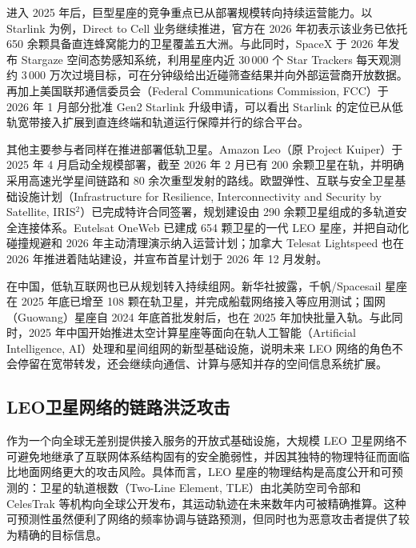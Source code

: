 进入 2025 年后，巨型星座的竞争重点已从部署规模转向持续运营能力。以 Starlink 为例，Direct to Cell 业务继续推进，官方在 2026 年初表示该业务已依托 650 余颗具备直连蜂窝能力的卫星覆盖五大洲。与此同时，SpaceX 于 2026 年发布 Stargaze 空间态势感知系统，利用星座内近 30\,000 个 Star Trackers 每天观测约 3\,000 万次过境目标，可在分钟级给出近碰筛查结果并向外部运营商开放数据。再加上美国联邦通信委员会（Federal Communications Commission, FCC）于 2026 年 1 月部分批准 Gen2 Starlink 升级申请，可以看出 Starlink 的定位已从低轨宽带接入扩展到直连终端和轨道运行保障并行的综合平台。

其他主要参与者同样在推进部署低轨卫星。Amazon Leo（原 Project Kuiper）于 2025 年 4 月启动全规模部署，截至 2026 年 2 月已有 200 余颗卫星在轨，并明确采用高速光学星间链路和 80 余次重型发射的路线。欧盟弹性、互联与安全卫星基础设施计划（Infrastructure for Resilience, Interconnectivity and Security by Satellite, IRIS$^2$）已完成特许合同签署，规划建设由 290 余颗卫星组成的多轨道安全连接体系。Eutelsat OneWeb 已建成 654 颗卫星的一代 LEO 星座，并把自动化碰撞规避和 2026 年主动清理演示纳入运营计划；加拿大 Telesat Lightspeed 也在 2026 年推进着陆站建设，并宣布首星计划于 2026 年 12 月发射。

在中国，低轨互联网也已从规划转入持续组网。新华社披露，千帆/Spacesail 星座在 2025 年底已增至 108 颗在轨卫星，并完成船载网络接入等应用测试；国网（Guowang）星座自 2024 年底首批发射后，也在 2025 年加快批量入轨。与此同时，2025 年中国开始推进太空计算星座等面向在轨人工智能（Artificial Intelligence, AI）处理和星间组网的新型基础设施，说明未来 LEO 网络的角色不会停留在宽带转发，还会继续向通信、计算与感知并存的空间信息系统扩展。


\subsection{LEO卫星网络的链路洪泛攻击}

作为一个向全球无差别提供接入服务的开放式基础设施，大规模 LEO 卫星网络不可避免地继承了互联网体系结构固有的安全脆弱性，并因其独特的物理特征而面临比地面网络更大的攻击风险。具体而言，LEO 星座的物理结构是高度公开和可预测的：卫星的轨道根数（Two-Line Element, TLE）由北美防空司令部和 CelesTrak 等机构向全球公开发布，其运动轨迹在未来数年内可被精确推算。这种可预测性虽然便利了网络的频率协调与链路预测，但同时也为恶意攻击者提供了较为精确的目标信息。

